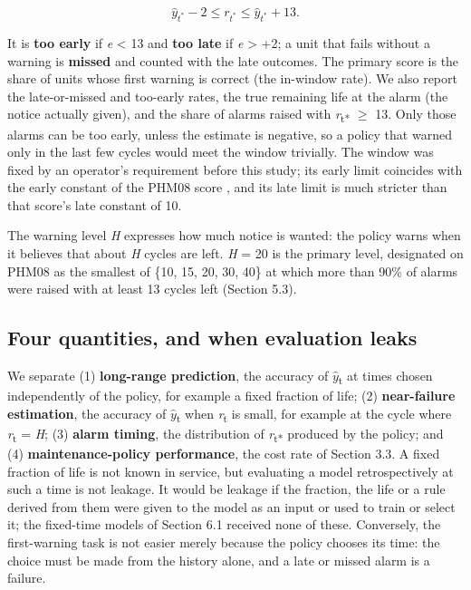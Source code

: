 \documentclass[a4paper,fleqn,doubleblind]{cas-dc}
\begin{document}
\begin{equation}
\hat{y}_{t^*} - 2 \le r_{t^*} \le \hat{y}_{t^*} + 13.
\end{equation}

It is \textbf{too early} if \textit{e} < \textminus{}13 and \textbf{too late} if \textit{e} > +2; a unit that fails without a warning is \textbf{missed} and counted with the late outcomes. The primary score is the share of units whose first warning is correct (the in-window rate). We also report the late-or-missed and too-early rates, the true remaining life at the alarm (the notice actually given), and the share of alarms raised with \textit{r}\textsubscript{t*} $\ge$ 13. Only those alarms can be too early, unless the estimate is negative, so a policy that warned only in the last few cycles would meet the window trivially. The window was fixed by an operator's requirement before this study; its early limit coincides with the early constant of the PHM08 score \cite{saxena2008}, and its late limit is much stricter than that score's late constant of 10.

The warning level \textit{H} expresses how much notice is wanted: the policy warns when it believes that about \textit{H} cycles are left. \textit{H} = 20 is the primary level, designated on PHM08 as the smallest of \{10, 15, 20, 30, 40\} at which more than 90\% of alarms were raised with at least 13 cycles left (Section 5.3).

\subsection{Four quantities, and when evaluation leaks}

We separate (1) \textbf{long-range prediction}, the accuracy of $\hat{y}$\textsubscript{t} at times chosen independently of the policy, for example a fixed fraction of life; (2) \textbf{near-failure estimation}, the accuracy of $\hat{y}$\textsubscript{t} when \textit{r}\textsubscript{t} is small, for example at the cycle where \textit{r}\textsubscript{t} = \textit{H}; (3) \textbf{alarm timing}, the distribution of \textit{r}\textsubscript{t*} produced by the policy; and (4) \textbf{maintenance-policy performance}, the cost rate of Section 3.3. A fixed fraction of life is not known in service, but evaluating a model retrospectively at such a time is not leakage. It would be leakage if the fraction, the life or a rule derived from them were given to the model as an input or used to train or select it; the fixed-time models of Section 6.1 received none of these. Conversely, the first-warning task is not easier merely because the policy chooses its time: the choice must be made from the history alone, and a late or missed alarm is a failure.
\end{document}
